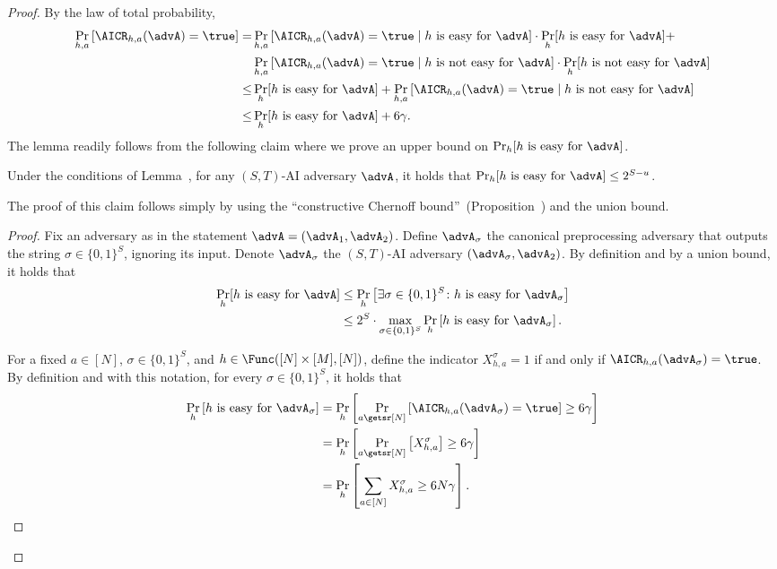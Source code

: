 {\begin{proof}
By the law of total probability, 
\begin{align*}
\Pr_{h,a}\left[{\AICR_{h,a}(\advA)}=\true\right] =& \Pr_{h,a}\left[{\AICR_{h,a}(\advA)=\true} \mid h\text{ is easy for }\advA\right]\cdot  \Pr_h[h\text{ is easy for }\advA] +\\&  \Pr_{h,a}\left[{\AICR_{h,a}(\advA) = \true} \mid h\text{ is not easy for }\advA\right]\cdot \Pr_h[h\text{ is not easy for }\advA] \\ 
\le & \Pr_h[h\text{ is easy for }\advA] + \Pr_{h,a}\left[{\AICR_{h,a}(\advA) = \true} \mid h\text{ is not easy for } \advA\right] \\ \le & \Pr_h[h\text{ is easy for }\advA] + 6\gamma.
\end{align*}
The lemma readily follows from the following claim where we prove an upper bound on $\Pr_h[h\text{ is easy for }\advA]$.
\begin{myclaim}
  Under the conditions of Lemma~, for any $(S,T)$-AI adversary $\advA$, it holds that $\Pr_h[h\text{ is easy for }\advA] \le 2^{S-u}$.
\end{myclaim}
The proof of this claim follows simply by using the ``constructive Chernoff bound''~(Proposition~) and the union bound.
\begin{proof}
Fix an adversary as in the statement $\advA = (\advA_1,\advA_2)$. Define $\advA_\sigma$ the canonical preprocessing adversary that outputs the string $\sigma\in \{0,1\}^S$, ignoring its input. Denote $\advA_\sigma$ the $(S,T)$-AI adversary $(\advA_\sigma,\advA_2)$. By definition and by a union bound, it holds that  
\begin{align}
\Pr_h[ h\text{ is easy for }\advA ] &\le \Pr_h\left[ \exists \sigma\in \{0,1\}^S \colon h\text{ is easy for } \advA_\sigma \right] \nonumber\\
& \le 2^S \cdot \max_{\sigma\in \{0,1\}^S}  \Pr_h\left[h\text{ is easy for } \advA_\sigma \right].\label{eq:lemma1:unionbound}
\end{align}

For a fixed $a\in [N]$, $\sigma\in\{0,1\}^S$, and  $h \in \Func([N]\times [M],[N])$, define the indicator $X_{h,a}^\sigma=1$ if and only if $\AICR_{h,a}(\advA_\sigma) = \true$. By definition and with this notation,  for every $\sigma\in \{0,1\}^S$, it holds that
\begin{align}
\Pr_h\left[h\text{ is easy for } \advA_\sigma \right] & =   \Pr_{h}\left[\Pr_{a\getsr [N]} \left[\AICR_{h,a}(\advA_{{\sigma}}) =\true\right]   \geq 6\gamma\right] \nonumber\\&
   = \Pr_{h}\left[\Pr_{a\getsr [N]} \left[X^\sigma_{h,a}\right]\geq 6\gamma\right] \nonumber\\ 
  & = \Pr_{h}\left[\sum_{a\in [N]}X^\sigma_{h,a}\geq 6N\gamma\right].\label{eq:lemma1:sumbound}
\end{align}


\end{proof}
\end{proof}}
